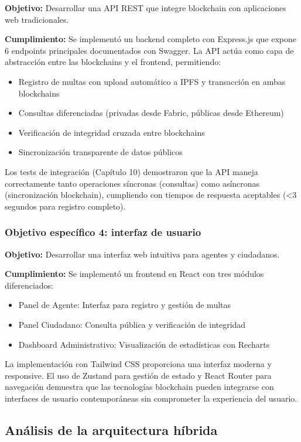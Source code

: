 \textbf{Objetivo:} Desarrollar una API REST que integre blockchain con aplicaciones web tradicionales.

\textbf{Cumplimiento:} Se implementó un backend completo con Express.js que expone 6 endpoints principales documentados con Swagger. La API actúa como capa de abstracción entre las blockchains y el frontend, permitiendo:
\begin{itemize}
    \item Registro de multas con upload automático a IPFS y transacción en ambas blockchains
    \item Consultas diferenciadas (privadas desde Fabric, públicas desde Ethereum)
    \item Verificación de integridad cruzada entre blockchains
    \item Sincronización transparente de datos públicos
\end{itemize}

Los tests de integración (Capítulo 10) demostraron que la API maneja correctamente tanto operaciones síncronas (consultas) como asíncronas (sincronización blockchain), cumpliendo con tiempos de respuesta aceptables (<3 segundos para registro completo).

\subsubsection{Objetivo específico 4: interfaz de usuario}

\textbf{Objetivo:} Desarrollar una interfaz web intuitiva para agentes y ciudadanos.

\textbf{Cumplimiento:} Se implementó un frontend en React con tres módulos diferenciados:
\begin{itemize}
    \item Panel de Agente: Interfaz para registro y gestión de multas
    \item Panel Ciudadano: Consulta pública y verificación de integridad
    \item Dashboard Administrativo: Visualización de estadísticas con Recharts
\end{itemize}

La implementación con Tailwind CSS proporciona una interfaz moderna y responsive. El uso de Zustand para gestión de estado y React Router para navegación demuestra que las tecnologías blockchain pueden integrarse con interfaces de usuario contemporáneas sin comprometer la experiencia del usuario.

\subsection{Análisis de la arquitectura híbrida}

